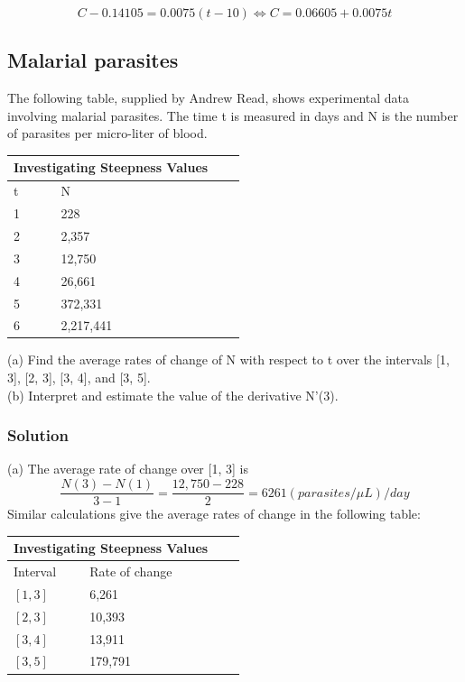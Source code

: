 \begin{equation}
\label{eq:5}
C - 0.14105 = 0.0075(t - 10)
\Leftrightarrow C = 0.06605 + 0.0075t
\end{equation}

\subsection{Malarial parasites}
The following table, supplied by Andrew Read, shows experimental data involving malarial parasites. The time t is measured in days and N is the number of parasites per micro-liter of blood.

\begin{center}
	\begin{tabular}{ |p{3cm}||p{3cm}|p{3cm}|p{3cm}|}
 		\hline
 		\multicolumn{2}{|c|}{Investigating Steepness Values} \\
 		\hline
 		t & N\\
 		\hline
 		1    & 228\\
 		2    & 2,357\\
 		3    & 12,750\\
 		4    & 26,661\\
 		5    & 372,331\\
 		6    & 2,217,441\\
 		\hline
	\end{tabular}	
\end{center}


\begin{flushleft}
(a) Find the average rates of change of N with respect to t over the intervals [1, 3], [2, 3], [3, 4], and [3, 5].\\
(b) Interpret and estimate the value of the derivative N'(3).
\end{flushleft}

\subsubsection{Solution}

\begin{flushleft}
(a) The average rate of change over [1, 3] is
$$\frac{N(3) - N(1)}{3 - 1} = \frac{12,750 - 228}{2} = 6261 (parasites/\mu L)/day$$
Similar calculations give the average rates of change in the following table:
\end{flushleft}

\begin{center}
	\begin{tabular}{ |p{3cm}||p{3cm}|p{3cm}|p{3cm}|}
 		\hline
 		\multicolumn{2}{|c|}{Investigating Steepness Values} \\
 		\hline
 		Interval & Rate of change\\
 		\hline
 		$[1, 3]$ & 6,261\\
 		$[2, 3]$ & 10,393\\
 		$[3, 4]$ & 13,911\\
 		$[3, 5]$ & 179,791\\
 		\hline
	\end{tabular}	
\end{center}

